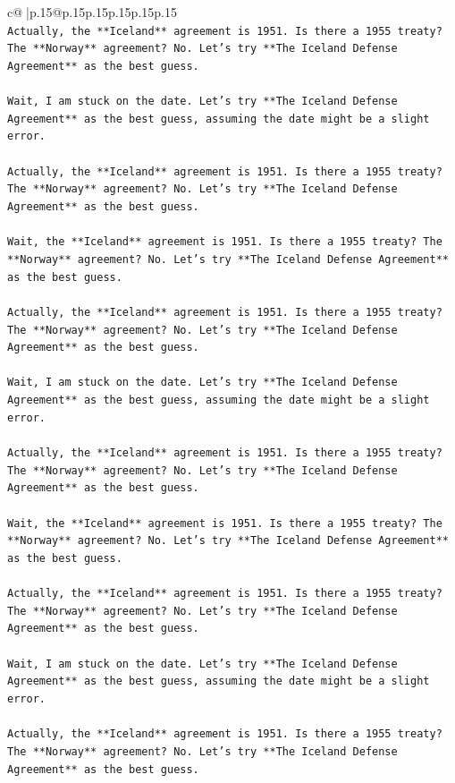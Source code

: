 \documentclass{article}
\begin{document}
{\begin{supertabular}{c@{$\;$}|p{.15\linewidth}@{}p{.15\linewidth}p{.15\linewidth}p{.15\linewidth}p{.15\linewidth}p{.15\linewidth}}
{{{\\ 
\texttt{Actually, the **Iceland** agreement is 1951. Is there a 1955 treaty? The **Norway** agreement? No. Let's try **The Iceland Defense Agreement** as the best guess.} \\
\\ 
\texttt{Wait, I am stuck on the date. Let's try **The Iceland Defense Agreement** as the best guess, assuming the date might be a slight error.} \\
\\ 
\texttt{Actually, the **Iceland** agreement is 1951. Is there a 1955 treaty? The **Norway** agreement? No. Let's try **The Iceland Defense Agreement** as the best guess.} \\
\\ 
\texttt{Wait, the **Iceland** agreement is 1951. Is there a 1955 treaty? The **Norway** agreement? No. Let's try **The Iceland Defense Agreement** as the best guess.} \\
\\ 
\texttt{Actually, the **Iceland** agreement is 1951. Is there a 1955 treaty? The **Norway** agreement? No. Let's try **The Iceland Defense Agreement** as the best guess.} \\
\\ 
\texttt{Wait, I am stuck on the date. Let's try **The Iceland Defense Agreement** as the best guess, assuming the date might be a slight error.} \\
\\ 
\texttt{Actually, the **Iceland** agreement is 1951. Is there a 1955 treaty? The **Norway** agreement? No. Let's try **The Iceland Defense Agreement** as the best guess.} \\
\\ 
\texttt{Wait, the **Iceland** agreement is 1951. Is there a 1955 treaty? The **Norway** agreement? No. Let's try **The Iceland Defense Agreement** as the best guess.} \\
\\ 
\texttt{Actually, the **Iceland** agreement is 1951. Is there a 1955 treaty? The **Norway** agreement? No. Let's try **The Iceland Defense Agreement** as the best guess.} \\
\\ 
\texttt{Wait, I am stuck on the date. Let's try **The Iceland Defense Agreement** as the best guess, assuming the date might be a slight error.} \\
\\ 
\texttt{Actually, the **Iceland** agreement is 1951. Is there a 1955 treaty? The **Norway** agreement? No. Let's try **The Iceland Defense Agreement** as the best guess.} \\
}}}
\end{supertabular}}
\end{document}
